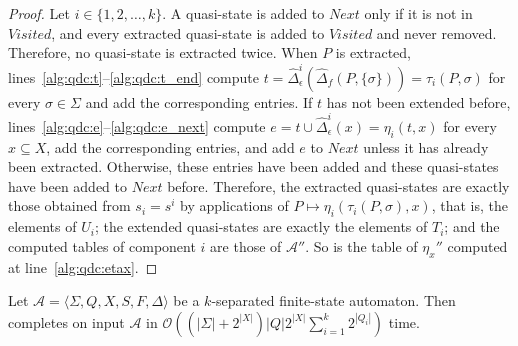   \begin{proof}
    Let $i \in \{ 1, 2, \ldots, k \}$. A quasi-state is added to $Next$ only if it is
    not in $Visited$, and every extracted quasi-state is added to $Visited$ and never
    removed. Therefore, no quasi-state is extracted twice. When $P$ is extracted,
    lines~\ref{alg:qdc:t}--\ref{alg:qdc:t_end} compute $t =
    \hat{\Delta}_\epsilon^i(\hat{\Delta}_f(P, \{ \sigma \})) = \tau_i(P, \sigma)$ for
    every $\sigma \in \Sigma$ and add the corresponding entries. If $t$ has not been
    extended before, lines~\ref{alg:qdc:e}--\ref{alg:qdc:e_next} compute $e = t \cup
    \hat{\Delta}_\epsilon^i(x) = \eta_i(t, x)$ for every $x \subseteq X$, add the
    corresponding entries, and add $e$ to $Next$ unless it has already been extracted.
    Otherwise, these entries have been added and these quasi-states have been added to
    $Next$ before. Therefore, the extracted quasi-states are exactly those obtained from
    $s_i = s^i$ by applications of $P \mapsto \eta_i(\tau_i(P, \sigma), x)$, that is,
    the elements of $U_i$; the extended quasi-states are exactly the elements of $T_i$;
    and the computed tables of component $i$ are those of $\mathcal{A}''$. So is the
    table of $\eta_x''$ computed at line~\ref{alg:qdc:etax}.
  \end{proof}

  \begin{proposition}\label{prop:quasidet_components_complexity}
    Let $\mathcal{A} = \langle \Sigma, Q, X, S, F, \Delta \rangle$ be a
    $k$-separated finite-state automaton. Then 
    completes on input $\mathcal{A}$ in $\mathcal{O}((|\Sigma| + 2^{|X|}) |Q| 2^{|X|}
    \sum_{i=1}^k 2^{|Q_i|})$ time.
  \end{proposition}

